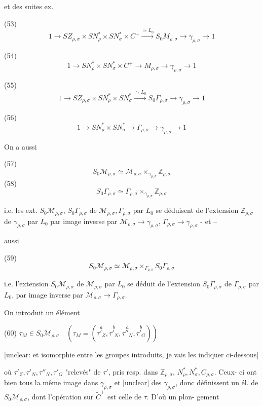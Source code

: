 \begin{enumerate}
et des suites ex.

(53)
$$ 1 \to S Z_{\rho,\sigma} \times S N_\rho^* \times S N_\sigma^* \times C^+ \xrightarrow{\simeq L_0} S_0 M_{\rho,\sigma} \to \gamma_{\rho,\sigma} \to 1 $$

(54)
$$ 1 \to S N_\rho^* \times S N_\sigma^* \times C^+ \to M_{\rho,\sigma} \to \gamma_{\rho,\sigma} \to 1 $$

(55)
$$ 1 \to S Z_{\rho,\sigma} \times S N_\rho^* \times S N_\sigma^* \xrightarrow{\simeq L_0} S_0 \Gamma_{\rho,\sigma} \to \gamma_{\rho,\sigma} \to 1 $$

(56)
$$ 1 \to S N_\rho^* \times S N_\sigma^* \to \Gamma_{\rho,\sigma} \to \gamma_{\rho,\sigma} \to 1 $$

\newpage


On a aussi

(57) $$S_0 \mathcal{M}_{\rho,\sigma} \simeq \mathcal{M}_{\rho,\sigma} \times_{\gamma_{\rho,\sigma}} \mathbb{Z}_{\rho,\sigma}$$
(58) $$S_0 \Gamma_{\rho,\sigma} \simeq \Gamma_{\rho,\sigma} \times_{\gamma_{\rho,\sigma}} \mathbb{Z}_{\rho,\sigma}$$

i.e. les ext. $S_0 \mathcal{M}_{\rho,\sigma}$, $S_0 \Gamma_{\rho,\sigma}$ de $\mathcal{M}_{\rho,\sigma}, \Gamma_{\rho,\sigma}$
par $L_0$ se déduisent de l'extension $\mathbb{Z}_{\rho,\sigma}$ de
$\gamma_{\rho,\sigma}$ par $L_0$ par image inverse par
$\mathcal{M}_{\rho,\sigma} \to \gamma_{\rho,\sigma}$, $\Gamma_{\rho,\sigma} \to \gamma_{\rho,\sigma}$ - et --

aussi

(59) $$S_0 \mathcal{M}_{\rho,\sigma} \simeq \mathcal{M}_{\rho,\sigma} \times_{\Gamma_{\rho,\sigma}} S_0 \Gamma_{\rho,\sigma}$$

i.e. l'extension $S_0 \mathcal{M}_{\rho,\sigma}$ de $\mathcal{M}_{\rho,\sigma}$ par $L_0$
se déduit de l'extension $S_0 \Gamma_{\rho,\sigma}$ de
$\Gamma_{\rho,\sigma}$ par $L_0$, par image inverse par
$\mathcal{M}_{\rho,\sigma} \to \Gamma_{\rho,\sigma}$.

On introduit un élément

(60) $\tau_M \in S_0 \mathcal{M}_{\rho,\sigma} \quad (\tau_M = (\overset{a}{\tau'_Z}, \overset{b}{\tau'_N}, \overset{a}{\tau''_N}, \overset{b}{\tau'_G}))$

[unclear: et isomorphie entre les groupes introduits, je vais les indiquer ci-dessous]

où $\tau'_Z, \tau'_N, \tau''_N, \tau'_G$
"relevés" de $\tau'$, pris resp. dans $\mathbb{Z}_{\rho,\sigma}$, $N_\rho^*, N_\sigma^*, C_{\rho,\sigma}$. Ceux-
ci ont bien tous la même image dans $\gamma_{\rho,\sigma}$ et [unclear]
des $\gamma_{\rho,\sigma}$, donc définissent un él. de $S_0 \mathcal{M}_{\rho,\sigma}$, dont
l'opération sur $\widetilde{C}^+$ est celle de $\tau$. D'où un plon-
gement


\end{enumerate}
